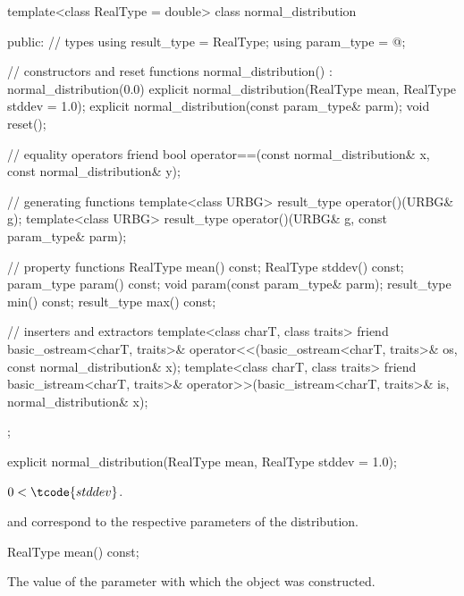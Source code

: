 %
%
\begin{codeblock}
template<class RealType = double>
  class normal_distribution {
  public:
    // types
    using result_type = RealType;
    using param_type  = @\unspec@;

    // constructors and reset functions
    normal_distribution() : normal_distribution(0.0) {}
    explicit normal_distribution(RealType mean, RealType stddev = 1.0);
    explicit normal_distribution(const param_type& parm);
    void reset();

    // equality operators
    friend bool operator==(const normal_distribution& x, const normal_distribution& y);

    // generating functions
    template<class URBG>
      result_type operator()(URBG& g);
    template<class URBG>
      result_type operator()(URBG& g, const param_type& parm);

    // property functions
    RealType mean() const;
    RealType stddev() const;
    param_type param() const;
    void param(const param_type& parm);
    result_type min() const;
    result_type max() const;

    // inserters and extractors
    template<class charT, class traits>
      friend basic_ostream<charT, traits>&
        operator<<(basic_ostream<charT, traits>& os, const normal_distribution& x);
    template<class charT, class traits>
      friend basic_istream<charT, traits>&
        operator>>(basic_istream<charT, traits>& is, normal_distribution& x);
  };
\end{codeblock}

%
\begin{itemdecl}
explicit normal_distribution(RealType mean, RealType stddev = 1.0);
\end{itemdecl}

\begin{itemdescr}
\pnum
\expects
$0 < \tcode{stddev}$.

\pnum
\remarks
{} and 
correspond to the respective parameters of the distribution.
\end{itemdescr}

%
\begin{itemdecl}
RealType mean() const;
\end{itemdecl}

\begin{itemdescr}
\pnum
\returns
The value of the  parameter
 with which the object was constructed.
\end{itemdescr}

